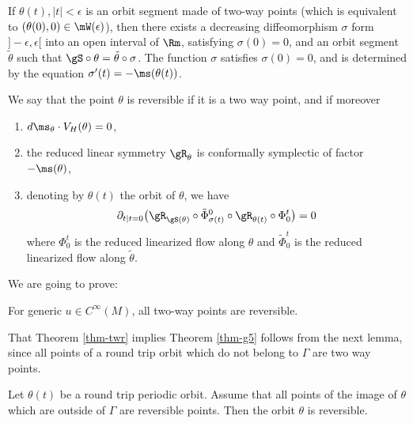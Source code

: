 If $\theta(t), |t|<\epsilon$ is an orbit segment made of two-way points (which is equivalent to $(\theta(0),0)\in \mW(\epsilon)$), then
there exists a decreasing diffeomorphism $\sigma $ form $]-\epsilon,\epsilon[$ into an open interval of $\Rm$, satisfying
$\sigma(0)=0$, and an orbit segment
$\tilde \theta$ such that $\gS\circ \theta = \tilde \theta\circ \sigma$. The function $\sigma$ satisfies $\sigma(0)=0$, and is determined by the equation
$ \sigma'(t)=-\ms(\theta(t))$.

\begin{defn}\label{def-rp}
We say that the point $\theta$ is reversible if it is a two way point, and if moreover
\begin{enumerate}
\item
$d\ms_{\theta}\cdot V_H(\theta)=0$,
\item
the reduced linear symmetry $\gR_{\theta}$ is conformally symplectic of factor $-\ms(\theta)$,
\item
denoting by $\theta(t)$ the orbit of $\theta$, we have
\[
\partial_{t|t=0} \big(\gR_{\gS(\theta)}\circ\tilde \Phi_{\sigma(t)}^0\circ\gR_{\theta(t)}\circ \Phi_0^t\big) =0
\]
where $\Phi_0^t$ is the reduced linearized flow along $\theta$ and $\tilde \Phi_0^t$ is the reduced linearized flow along $\tilde \theta$.
\end{enumerate}
\end{defn}

We are going to prove:

\begin{thm}\label{thm-twr}
For generic $u\in C^{\infty}(M)$, all two-way points are reversible.
\end{thm}

That Theorem \ref{thm-twr} implies Theorem \ref{thm-g5} follows from the next lemma, since all points
of a round trip orbit which do not belong to $\Gamma$ are two way points.

\begin{lem}\label{lem-rtr}
Let $\theta(t)$ be a round trip periodic orbit. Assume that all points of the image of $\theta$ which are outside of $\Gamma$ are reversible points. Then the orbit $\theta$ is reversible.
\end{lem}

